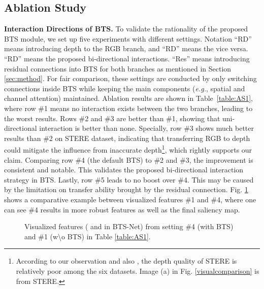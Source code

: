 \documentclass{article}
\begin{document}
\vspace{-0.5cm}
\subsection{Ablation Study}
\label{sec:AblationStduy}
\vspace{-0.1cm}

\textbf{Interaction Directions of BTS.} To validate the rationality of the proposed BTS module, we set up five experiments with different settings. Notation ``RD'' means introducing depth to the RGB branch, and ``RD'' means the vice versa. ``RD'' means the proposed bi-directional interactions. ``Res'' means introducing residual connections into BTS for both branches as mentioned in Section \ref{sec:method}. For fair comparison, these settings are conducted by only switching connections inside BTS while keeping the main components (\emph{e.g.}, spatial and channel attention) maintained. 
Ablation results are shown in Table~\ref{table:AS1}, where row \#1 means no interaction exists between the two branches, leading to the worst results. Rows \#2 and \#3 are better than \#1, showing that uni-directional interaction is better than none. Specially, row \#3 shows much better results than \#2 on STERE dataset, indicating that transferring RGB to depth could mitigate the influence from inaccurate depth\footnote{According to our observation and also \cite{JLDCF}, the depth quality of STERE is relatively poor among the six datasets. Image (a) in Fig. \ref{visualcomparison} is from STERE.}, which rightly supports our claim. Comparing row \#4 (the default BTS) to \#2 and \#3, the improvement is consistent and notable. This validates the proposed bi-directional interaction strategy in BTS. Lastly, row \#5 leads to no boost over \#4. This may be caused by the limitation on transfer ability brought by the residual connection. Fig. \ref{heatmap} shows a comparative example between visualized features \#1 and \#4, where one can see \#4 results in more robust features as well as the final saliency map.

\begin{figure}
  \centering
 \centerline{} \vspace{-0.3cm}
\caption{Visualized features ( and  in BTS-Net) from setting \#4 (with BTS) and \#1 (w\textbackslash o BTS) in Table \ref{table:AS1}.}\vspace{-0.3cm}
\label{heatmap}
\end{figure}
\end{document}
